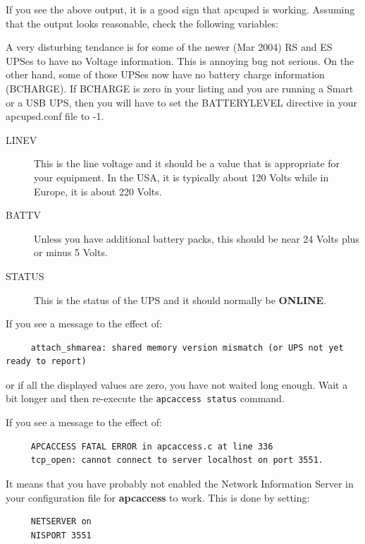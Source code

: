 If you see the above output, it is a good sign that apcupsd is working.
Assuming that the output looks reasonable, check the following variables:  

A very disturbing tendance is for some of the newer (Mar 2004) RS and ES UPSes
to have no Voltage information.  This is annoying bug not serious.  On the
other hand, some of those UPSes now have no battery charge information
(BCHARGE).  If BCHARGE is zero in your listing and you are running a Smart or
a USB UPS, then you will have to set the BATTERYLEVEL directive in your
apcupsd.conf file to -1.  

\begin{description}

\item [LINEV]
   This is the line voltage and it should be a value that is appropriate for your
equipment. In the USA, it is typically about 120 Volts while in Europe, it is
about 220 Volts.  

\item [BATTV]
   Unless you have additional battery packs, this should be near 24 Volts plus or
minus 5 Volts.  

\item [STATUS]
   This is the status of the UPS and it should normally be {\bf ONLINE}. 
\end{description}

If you see a message to the effect of: 

\footnotesize
\begin{verbatim}
     attach_shmarea: shared memory version mismatch (or UPS not yet ready to report)
\end{verbatim}
\normalsize

or if all the displayed values are zero, you have not waited long enough. Wait
a bit longer and then re-execute the {\tt apcaccess status} command.  

If you see a message to the effect of: 

\footnotesize
\begin{verbatim}
     APCACCESS FATAL ERROR in apcaccess.c at line 336
     tcp_open: cannot connect to server localhost on port 3551.
\end{verbatim}
\normalsize

It means that you have probably not enabled the Network Information Server in
your configuration file for {\bf apcaccess} to work. This is done by setting: 

\footnotesize
\begin{verbatim}
     NETSERVER on
     NISPORT 3551
\end{verbatim}
\normalsize

